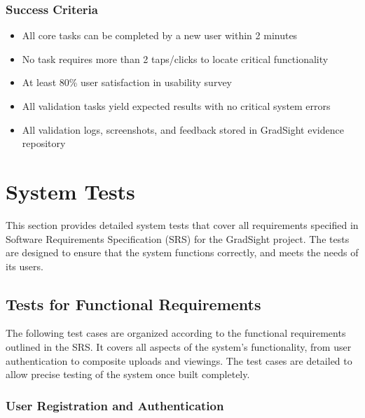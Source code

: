\documentclass[12pt, titlepage]{article}
\begin{document}
\subsubsection*{Success Criteria}
\begin{itemize}
    \item All core tasks can be completed by a new user within 2 minutes
    \item No task requires more than 2 taps/clicks to locate critical functionality
    \item At least 80\% user satisfaction in usability survey
    \item All validation tasks yield expected results with no critical system errors
    \item All validation logs, screenshots, and feedback stored in GradSight evidence repository
\end{itemize}




\section{System Tests}

This section provides detailed system tests that cover all requirements specified in Software Requirements Specification (SRS) for the GradSight project. The tests are designed to ensure that the system functions correctly, and meets the needs of its users.

\subsection{Tests for Functional Requirements}

The following test cases are organized according to the functional requirements outlined in the SRS. It covers all aspects of the system’s functionality, from user authentication to composite uploads and viewings. The test cases are detailed to allow precise testing of the system once built completely.

\subsubsection{User Registration and Authentication}
\end{document}
